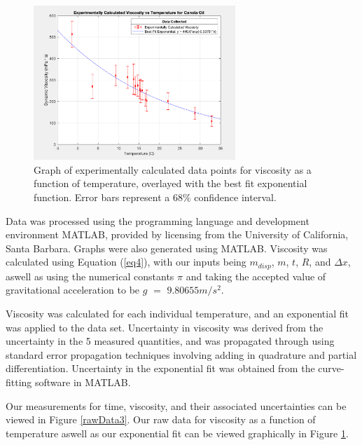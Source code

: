 \documentclass[aps,twocolumn,showpacs,preprintnumbers]{revtex4}
\begin{document}
\begin{figure}[t]
%
\includegraphics[width=3.0in]{graph1.png}
%
\caption{\label{graph} Graph of experimentally calculated data points for viscosity as a function of temperature, overlayed with the best fit exponential function. Error bars represent a 68$\%$ confidence interval.
}
%
\end{figure}
%

Data was processed using the programming language and development environment MATLAB\cite{MATLAB}, provided by licensing from the University of California, Santa Barbara. Graphs were also generated using MATLAB. Viscosity was calculated using Equation (\ref{eq4}), with our inputs being $m_{disp}$, $m$, $t$, $R$, and $\Delta x$, aswell as using the numerical constants $\pi$ and taking the accepted value of gravitational acceleration to be $g$ $=$ $9.80655 m/s^2$\cite{Gravity}. 

Viscosity was calculated for each individual temperature, and an exponential fit was applied to the data set.
Uncertainty in viscosity was derived from the uncertainty in the 5 measured quantities, and was propagated through using standard error propagation techniques involving adding in quadrature and partial differentiation\cite{ErrorPropagation}.
Uncertainty in the exponential fit was obtained from the curve-fitting software in MATLAB.

Our measurements for time, viscosity, and their associated uncertainties can be viewed in Figure \ref{rawData3}.
Our raw data for viscosity as a function of temperature aswell as our exponential fit can be viewed graphically in Figure \ref{graph}.
\end{document}
